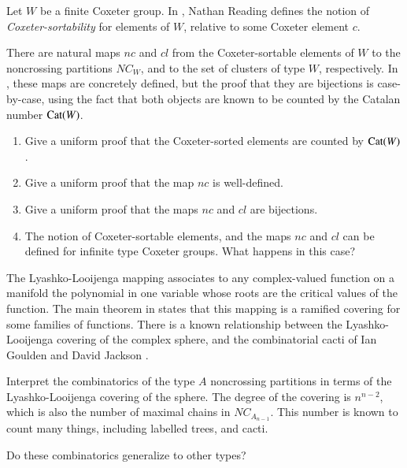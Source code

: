 \documentclass[12pt,letterpaper, reqno]{aimpl}
\newcommand{\Cat}{{\rm Cat}}
\begin{document}
\begin{problemblock}Let $W$ be a finite Coxeter group. In \cite{reading}, Nathan Reading defines the notion of \emph{Coxeter-sortability} for elements of $W$, relative to some Coxeter element $c$.

There are natural maps $nc$ and $cl$ from the Coxeter-sortable elements of $W$ to the noncrossing partitions $NC_W$, and to the set of clusters of type $W$, respectively. In \cite{reading}, these maps are concretely defined, but the proof that they are bijections is case-by-case, using the fact that both objects are known to be counted by the Catalan number $\Cat(W)$.

\begin{problem}[3.2]
 \label{prob:c-sorted}
\begin{enumerate}
\item Give a uniform proof that the Coxeter-sorted elements are counted by $\Cat(W)$.
\item Give a uniform proof that the map $nc$ is well-defined.
\item Give a uniform proof that the maps $nc$ and $cl$ are bijections.
\item The notion of Coxeter-sortable elements, and the maps $nc$ and $cl$ can be defined for infinite type Coxeter groups. What happens in this case?
\end{enumerate}

\end{problem}

\end{problemblock}

\begin{problemblock}

The Lyashko-Looijenga mapping associates to any complex-valued function on a manifold the polynomial in one variable whose roots are the critical values of the function. The main theorem in \cite{looijenga} states that this mapping is a ramified covering for some families of functions. There is a known relationship between the Lyashko-Looijenga covering of the complex sphere, and the combinatorial cacti of Ian Goulden and David Jackson \cite{goulden-jackson}.

Interpret the combinatorics of the type $A$ noncrossing partitions in terms of the Lyashko-Looijenga covering of the sphere. The degree of the covering is $n^{n-2}$, which is also the number of maximal chains in $NC_{A_{n-1}}$. This number is known to count many things, including labelled trees, and cacti.

\begin{problem}[3.3]
Do these combinatorics generalize to other types?\end{problem}

\end{problemblock}
\end{document}
